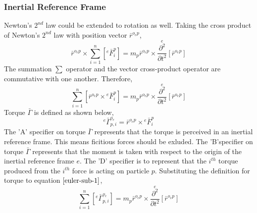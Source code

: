 \documentclass[class=report, 12pt, crop=false]{standalone}
\begin{document}
\begin{center}
\subsubsection{Inertial Reference Frame}
\begin{comment}
\end{comment}
Newton's $2^{nd}$ law could be extended to rotation as well. Taking the cross product of Newton's $2^{nd}$ law with position vector $\bar{r}^{o_{e}p}$,
$$\bar{r}^{o_{e}p}\times\sum^{n}_{i = 1}\left[{}^{e}\bar{F}^{p}_{i}\right] = m_{p}\bar{r}^{o_{e}p}\times\overset{e}{\frac{\partial^{2}}{\partial t^{2}}}[\bar{r}^{o_{e}p}]$$
The summation $\displaystyle\sum$ operator and the vector cross-product operator are commutative with one another. Therefore,
\begin{equation}\sum^{n}_{i = 1}\left[\bar{r}^{o_{e}p}\times{}^{e}\bar{F}^{p}_{i}\right] = m_{p}\bar{r}^{o_{e}p}\times\overset{e}{\frac{\partial^{2}}{\partial t^{2}}}[\bar{r}^{o_{e}p}]\label{euler-sub-1}\end{equation}
Torque $\bar{\Gamma}$ is defined as shown below,
\begin{equation}{}^{e}\bar{\Gamma}^{o_{e}}_{p,i} = \bar{r}^{o_{e}p}\times{}^{e}\bar{F}^{p}_{i}\label{torque-definition}\end{equation}
The 'A' specifier on torque $\bar{\Gamma}$ represents that the torque is perceived in an inertial reference frame. This means ficitious forces should be exluded. The 'B'specifier on torque $\bar{\Gamma}$ represents that the moment is taken with respect to the origin of the inertial reference frame $e$. The 'D' specifier is to represent that the $i^{th}$ torque produced from the $i^{th}$ force is acting on particle $p$. Substituting the definition for torque to equation $\ref{euler-sub-1}$,
\begin{equation}\sum^{n}_{i = 1}\left[{}^{e}\bar{\Gamma}^{o_{e}}_{p,i}\right] = m_{p}\bar{r}^{o_{e}p}\times\overset{e}{\frac{\partial^{2}}{\partial t^{2}}}[\bar{r}^{o_{e}p}]\label{euler-sub-2}\end{equation}


\end{center}
\end{document}
